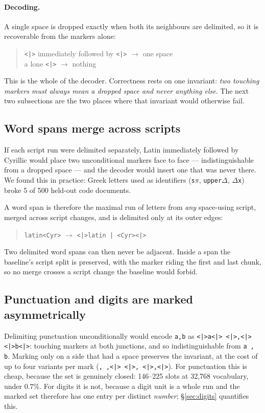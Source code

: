 \documentclass[11pt]{article}
\newcommand{\mk}{\texttt{<|>}}
\begin{document}
\paragraph{Decoding.} A single space is dropped exactly when both its neighbours are
delimited, so it is recoverable from the markers alone:
\begin{quote}\small
\mk{} immediately followed by \mk{} $\rightarrow$ one space \\
a lone \mk{} $\rightarrow$ nothing
\end{quote}
This is the whole of the decoder. Correctness rests on one invariant: \emph{two touching
markers must always mean a dropped space and never anything else}. The next two subsections
are the two places where that invariant would otherwise fail.

\subsection{Word spans merge across scripts}
\label{sec:spans}

If each script run were delimited separately, Latin immediately followed by Cyrillic would
place two unconditional markers face to face --- indistinguishable from a dropped space ---
and the decoder would insert one that was never there. We found this in practice: Greek
letters used as identifiers (\texttt{s$\pi$}, \texttt{upper$\Delta$}, \texttt{$\Delta$x})
broke 5 of 500 held-out code documents.

A word span is therefore the maximal run of letters from \emph{any} space-using script,
merged across script changes, and is delimited only at its outer edges:
\begin{quote}\small
\texttt{latin<Cyr>} $\rightarrow$ \texttt{\mk{}latin | <Cyr>\mk{}}
\end{quote}
Two delimited word spans can then never be adjacent. Inside a span the baseline's script
split is preserved, with the marker riding the first and last chunk, so no merge crosses a
script change the baseline would forbid.

\subsection{Punctuation and digits are marked asymmetrically}
\label{sec:asymmetric}

Delimiting punctuation unconditionally would encode \texttt{a,b} as
\texttt{\mk{}a\mk{} \mk{},\mk{} \mk{}b\mk{}}: touching markers at both junctions, and so
indistinguishable from \texttt{a , b}. Marking only on a side that had a space preserves the
invariant, at the cost of up to four variants per mark (\texttt{,}\ \texttt{,\mk{}}\
\texttt{\mk{},}\ \texttt{\mk{},\mk{}}). For punctuation this is cheap, because the set is
genuinely closed: 146--225 slots at 32{,}768 vocabulary, under 0.7\%. For digits it is not,
because a digit unit is a whole run and the marked set therefore has one entry per distinct
\emph{number}; \S\ref{sec:digits} quantifies this.
\end{document}

